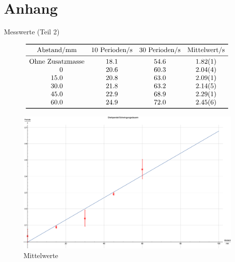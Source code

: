 \documentclass[11pt,a4paper]{article}
\begin{document}
\pagebreak

\section{Anhang}

\begin{table}[h]
\caption{Messwerte (Teil 2)}
$$
\begin{array}{cccc}	
	\toprule 
	\textrm{Abstand/mm} & \textrm{10 Perioden/s} & \textrm{30 Perioden/s} & \textrm{Mittelwert/s}\\ 
	\midrule
	\multicolumn{1}{l}{\textrm{Ohne Zusatzmasse}} & 18.1 & 54.6 & 1.82(1)\\
	\phantom{zz.}0 & 20.6 & 60.3 & 2.04(4)\\
	15.0 & 20.8 & 63.0 & 2.09(1)\\
	30.0 & 21.8 & 63.2 & 2.14(5)\\
	45.0 & 22.9 & 68.9 & 2.29(1)\\
	60.0 & 24.9 & 72.0 & 2.45(6)\\
	\bottomrule 
\end{array}
$$
\end{table}

\begin{figure}[h]
\centering
\includegraphics[width=1\textwidth]{trick17}
\renewcommand\thefigure{B3}
\caption{Mittelwerte}
\label{t17}
\end{figure}
\end{document}
